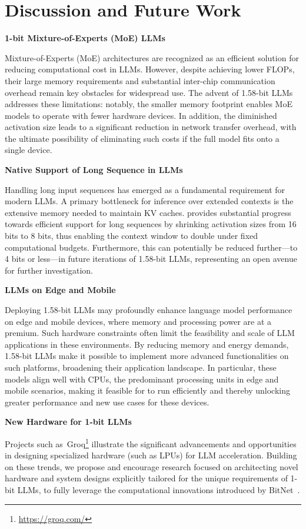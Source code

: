 \section{Discussion and Future Work}

\textbf{1-bit Mixture-of-Experts (MoE) LLMs}

Mixture-of-Experts (MoE) architectures are recognized as an efficient solution for reducing computational cost in LLMs. However, despite achieving lower FLOPs, their large memory requirements and substantial inter-chip communication overhead remain key obstacles for widespread use. The advent of 1.58-bit LLMs addresses these limitations: notably, the smaller memory footprint enables MoE models to operate with fewer hardware devices. In addition, the diminished activation size leads to a significant reduction in network transfer overhead, with the ultimate possibility of eliminating such costs if the full model fits onto a single device.

\textbf{Native Support of Long Sequence in LLMs}

Handling long input sequences has emerged as a fundamental requirement for modern LLMs. A primary bottleneck for inference over extended contexts is the extensive memory needed to maintain KV caches.  provides substantial progress towards efficient support for long sequences by shrinking activation sizes from 16 bits to 8 bits, thus enabling the context window to double under fixed computational budgets. Furthermore, this can potentially be reduced further—to 4 bits or less—in future iterations of 1.58-bit LLMs, representing an open avenue for further investigation.

\textbf{LLMs on Edge and Mobile}

Deploying 1.58-bit LLMs may profoundly enhance language model performance on edge and mobile devices, where memory and processing power are at a premium. Such hardware constraints often limit the feasibility and scale of LLM applications in these environments. By reducing memory and energy demands, 1.58-bit LLMs make it possible to implement more advanced functionalities on such platforms, broadening their application landscape. In particular, these models align well with CPUs, the predominant processing units in edge and mobile scenarios, making it feasible for  to run efficiently and thereby unlocking greater performance and new use cases for these devices.

\textbf{New Hardware for 1-bit LLMs}

Projects such as~Groq\footnote{\url{https://groq.com/}} illustrate the significant advancements and opportunities in designing specialized hardware (such as LPUs) for LLM acceleration. Building on these trends, we propose and encourage research focused on architecting novel hardware and system designs explicitly tailored for the unique requirements of 1-bit LLMs, to fully leverage the computational innovations introduced by BitNet~\cite{bitnet}.